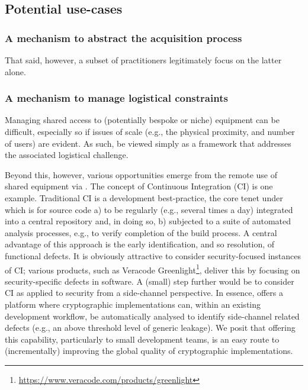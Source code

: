 
\subsection{Potential use-cases}


\subsubsection{A mechanism to abstract the acquisition process}


That said, however, a subset of practitioners legitimately focus on the
latter alone.



\subsubsection{A mechanism to manage logistical constraints}

Managing shared access to (potentially bespoke or niche) equipment can be 
difficult, especially so if issues of scale (e.g., the physical proximity, 
and number of users) are evident.  As such,  be viewed 
simply as a framework that addresses the associated logistical challenge.

Beyond this, however, various opportunities emerge from the remote use of
shared equipment via \SCAAAS.  The concept of Continuous Integration (CI)
is one example.  Traditional CI is a development best-practice, the core 
tenet under which is for source code 
a) to be regularly (e.g., several times a day) integrated into a central repository 
   and, in doing so, 
b) subjected to a suite of automated analysis processes, e.g., to verify completion of the build process.
A central advantage of this approach is the early identification, and so
resolution, of functional defects.  
It is obviously attractive to consider security-focused instances of CI;
various products, such as Veracode Greenlight\footnote{
\url{https://www.veracode.com/products/greenlight}
}, deliver this by focusing on security-specific defects in software.  A
(small) step further would be to consider CI as applied to security from
a side-channel perspective.  In essence, \SCAAAS offers a platform where 
cryptographic implementations can, within an existing development workflow,
be automatically analysed to identify side-channel related defects (e.g., 
an above threshold level of generic leakage).
We posit that offering this capability, particularly to small development
teams, is an easy route to (incrementally) improving the global quality 
of cryptographic implementations.

